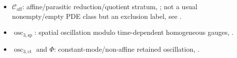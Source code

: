 \documentclass[11pt]{amsart}
\numberwithin{equation}{section}
\theoremstyle{plain}
\theoremstyle{definition}
\theoremstyle{remark}
\newcommand{\Caff}{\mathcal C_{\mathrm{aff}}}
\newcommand{\oscsp}{\operatorname{osc}_{3,\mathrm{sp}}}
\newcommand{\actthree}{\operatorname{osc}_{3,\mathrm{ct}}}
\begin{document}
\begin{itemize}[leftmargin=1.6em]
      with pressure-defect, viscous-defect, affine-quotient, virial, and support
      coordinates; abbreviated as \((\bar W,\mathcal Y,\Lambda)\) only when the
      extra coordinates are zero or irrelevant, .
   \item \(\Caff\): affine/parasitic reduction/quotient stratum,
      ; not a usual nonempty/empty PDE
      class but an exclusion label, see
      .
   \item \(\oscsp\): spatial oscillation modulo time-dependent homogeneous
      gauges, .
   \item \(\actthree\) and \(\Phi\): constant-mode/non-affine retained
      oscillation, .
\end{itemize}
\end{document}
